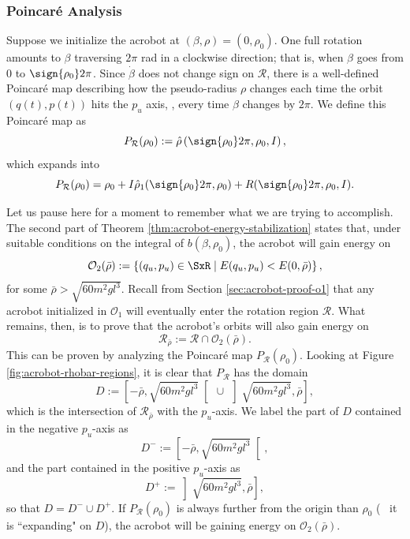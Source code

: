 \subsubsection*{Poincar\'{e} Analysis}

Suppose we initialize the acrobot at \((\beta,\rho) = (0,\rho_0)\).
One full rotation amounts to \(\beta\) traversing \(2\pi\) rad in a clockwise
direction; that is, when \(\beta\) goes from \(0\) to \(\sign{\rho_0}2\pi\).
Since \(\dot{\beta}\) does not change sign on \(\mathcal{R}\),
there is a well-defined Poincar\'{e} map describing how the pseudo-radius
\(\rho\) changes each time the orbit \((q(t),p(t))\) hits the \(p_u\) axis, \ie,
every time \(\beta\) changes by \(2\pi\).
We define this Poincar\'{e} map as
\[
    P_\mathcal{R}(\rho_0) := \hat{\rho}\left(\sign{\rho_0}2\pi,\rho_0,I\right)
    ,
\]
which expands into
\[
    P_\mathcal{R}(\rho_0) = \rho_0 + I \hat{\rho}_1(\sign{\rho_0}2\pi, \rho_0)
    + R(\sign{\rho_0}2\pi,\rho_0,I)
    .
\]

Let us pause here for a moment to remember what we are trying to accomplish.
The second part of Theorem \ref{thm:acrobot-energy-stabilization} states that,
under suitable conditions on the integral of \(b(\beta,\rho_0)\), 
the acrobot will gain energy on 
\[
    \mathcal{O}_2(\bar{\rho}) := \left\{ (q_u,p_u) \in \SxR
    \mid E(q_u,p_u) < E(0,\bar{\rho}) \right\}
    ,
\]
for some \(\bar{\rho} > \sqrt{60m^2gl^3}\).
Recall from Section \ref{sec:acrobot-proof-o1} that any acrobot initialized in
\(\mathcal{O}_1\) will eventually enter the rotation region \(\mathcal{R}\).
What remains, then, is to prove that the acrobot's orbits will also gain
energy on
\[
    \mathcal{R}_{\bar{\rho}} := \mathcal{R} \cap \mathcal{O}_2(\bar{\rho})
    .
\]
This can be proven by analyzing the Poincar\'{e} map \(P_\mathcal{R}(\rho_0)\).
Looking at Figure \ref{fig:acrobot-rhobar-regions}, it is clear that
\(P_\mathcal{R}\) has the domain
\[
    D := \left[-\bar{\rho},\sqrt{60m^2gl^3}\right[ \, 
    \cup \, 
    \left]\sqrt{60m^2gl^3},\bar{\rho}\right]
    ,
\]
which is the intersection of \(\mathcal{R}_{\bar{\rho}}\) with the \(p_u\)-axis.
We label the part of \(D\) contained in the negative \(p_u\)-axis as
\[
    D^- :=\left[-\bar{\rho},\sqrt{60m^2gl^3}\right[
    ,
\]
and the part contained in the positive \(p_u\)-axis as
\[
    D^+ := \left]\sqrt{60m^2gl^3},\bar{\rho}\right]
    ,
\]
so that \(D = D^- \cup D^+\).
If \(P_\mathcal{R}(\rho_0)\) is always further from the origin than 
\(\rho_0\) (\ie~ it is ``expanding" on \(D\)), the acrobot will be gaining energy
on \(\mathcal{O}_2(\bar{\rho})\).

